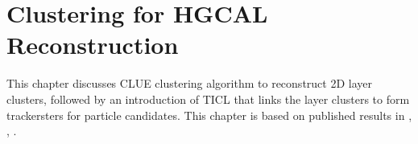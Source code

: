 \chapter{Clustering for HGCAL Reconstruction}
\label{sec:relatedworks}

This chapter discusses CLUE clustering algorithm to reconstruct 2D layer clusters, followed by an introduction of TICL that 
links the layer clusters to form trackersters for particle candidates. This chapter is based on published results in 
\cite{cluepaper}, \cite{Chen:2020mih}, \cite{DiPilato:2020mqs}.











